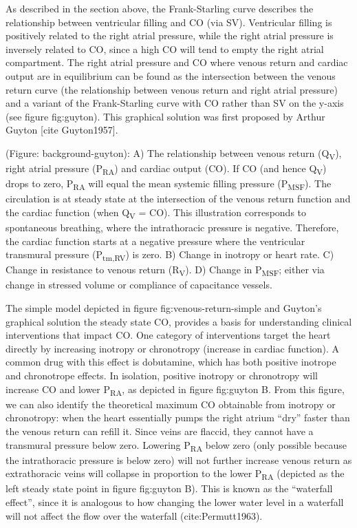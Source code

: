 \documentclass[a4paper, nobind]{templates/ociamthesis}
\begin{document}
As described in the section above, the Frank-Starling curve describes the relationship between ventricular filling and CO (via SV). Ventricular filling is positively related to the right atrial pressure, while the right atrial pressure is inversely related to CO, since a high CO will tend to empty the right atrial compartment. The right atrial pressure and CO where venous return and cardiac output are in equilibrium can be found as the intersection between the venous return curve (the relationship between venous return and right atrial pressure) and a variant of the Frank-Starling curve with CO rather than SV on the y-axis (see figure fig:guyton). This graphical solution was first proposed by Arthur Guyton {[}cite Guyton1957{]}.

(Figure: background-guyton): A) The relationship between venous return (Q\textsubscript{V}), right atrial pressure (P\textsubscript{RA}) and cardiac output (CO). If CO (and hence Q\textsubscript{V}) drops to zero, P\textsubscript{RA} will equal the mean systemic filling pressure (P\textsubscript{MSF}). The circulation is at steady state at the intersection of the venous return function and the cardiac function (when Q\textsubscript{V} = CO). This illustration corresponds to spontaneous breathing, where the intrathoracic pressure is negative. Therefore, the cardiac function starts at a negative pressure where the ventricular transmural pressure (P\textsubscript{tm,RV}) is zero. B) Change in inotropy or heart rate. C) Change in resistance to venous return (R\textsubscript{V}). D) Change in P\textsubscript{MSF}; either via change in stressed volume or compliance of capacitance vessels.

The simple model depicted in figure fig:venous-return-simple and Guyton's graphical solution the steady state CO, provides a basis for understanding clinical interventions that impact CO. One category of interventions target the heart directly by increasing inotropy or chronotropy (increase in cardiac function). A common drug with this effect is dobutamine, which has both positive inotrope and chronotrope effects. In isolation, positive inotropy or chronotropy will increase CO and lower P\textsubscript{RA}, as depicted in figure fig:guyton B. From this figure, we can also identify the theoretical maximum CO obtainable from inotropy or chronotropy: when the heart essentially pumps the right atrium ``dry'' faster than the venous return can refill it. Since veins are flaccid, they cannot have a transmural pressure below zero. Lowering P\textsubscript{RA} below zero (only possible because the intrathoracic pressure is below zero) will not further increase venous return as extrathoracic veins will collapse in proportion to the lower P\textsubscript{RA} (depicted as the left steady state point in figure fig:guyton B). This is known as the ``waterfall effect'', since it is analogous to how changing the lower water level in a waterfall will not affect the flow over the waterfall (cite:Permutt1963).
\end{document}
